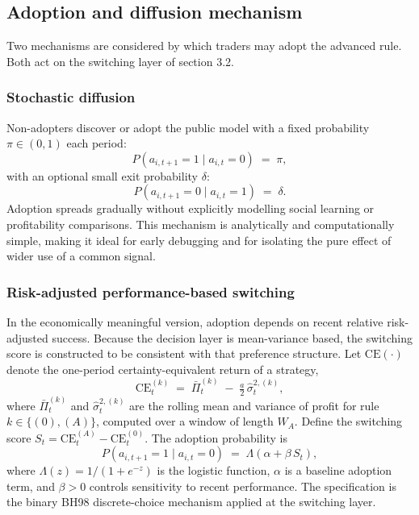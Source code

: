 \documentclass[11pt]{article}
\begin{document}
\subsection{Adoption and diffusion mechanism}

Two mechanisms are considered by which traders may adopt the advanced rule. Both act on the switching layer of section 3.2.

\subsubsection{Stochastic diffusion}

Non-adopters discover or adopt the public model with a fixed probability $\pi \in (0, 1)$ each period:
\begin{equation}
  P(a_{i,t+1} = 1 \mid a_{i,t} = 0) \;=\; \pi,
\end{equation}
with an optional small exit probability $\delta$:
\begin{equation}
  P(a_{i,t+1} = 0 \mid a_{i,t} = 1) \;=\; \delta.
\end{equation}
Adoption spreads gradually without explicitly modelling social learning or profitability comparisons. This mechanism is analytically and computationally simple, making it ideal for early debugging and for isolating the pure effect of wider use of a common signal.

\subsubsection{Risk-adjusted performance-based switching}

In the economically meaningful version, adoption depends on recent relative risk-adjusted success. Because the decision layer is mean-variance based, the switching score is constructed to be consistent with that preference structure. Let $\mathrm{CE}(\cdot)$ denote the one-period certainty-equivalent return of a strategy,
\begin{equation}
  \mathrm{CE}_t^{(k)} \;=\; \bar{\Pi}_t^{(k)} \;-\; \tfrac{a}{2}\, \hat{\sigma}_{t}^{2,(k)},
\end{equation}
where $\bar{\Pi}_t^{(k)}$ and $\hat{\sigma}_{t}^{2,(k)}$ are the rolling mean and variance of profit for rule $k \in \{(0), (A)\}$, computed over a window of length $W_A$. Define the switching score $S_t = \mathrm{CE}_t^{(A)} - \mathrm{CE}_t^{(0)}$. The adoption probability is
\begin{equation}
  P(a_{i,t+1} = 1 \mid a_{i,t} = 0) \;=\; \Lambda(\alpha + \beta\, S_t),
\end{equation}
where $\Lambda(z) = 1 / (1 + e^{-z})$ is the logistic function, $\alpha$ is a baseline adoption term, and $\beta > 0$ controls sensitivity to recent performance. The specification is the binary BH98 discrete-choice mechanism applied at the switching layer.
\end{document}
